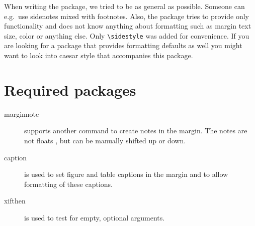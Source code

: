\documentclass[]{caesar_book}
\begin{document}
When writing the package, we tried to be as general as possible. Someone can e.g.\ use sidenotes mixed with
footnotes. Also, the package tries to provide only functionality and does not know anything about formatting
such as margin text size, color or anything else. Only \verb+\sidestyle+ was added for convenience. If you are
looking for a package that provides formatting defaults as well you might want to look into caesar style that accompanies this package.

\section{Required packages}
\begin{description}
     \item[marginnote]
        supports another command to create notes in the margin. The notes are not floats , but can be manually shifted up or down. 
     \item[caption]
        is used to set figure and table captions in the margin and to allow formatting of these captions.
	\item[xifthen] is used to test for empty, optional arguments.  
\end{description}%
\end{document}

